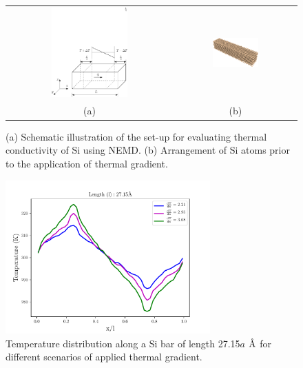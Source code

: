  
 \begin{center}
\begin{figure}[p]
\begin{tabular}{cc}
  \includegraphics[width=0.48\textwidth]{./Figures/schematic}
  &
  \hspace{3mm}
  \includegraphics[width=0.40\textwidth]{./Figures/Sibar_05}
  \\ (a) & (b)
  \end{tabular}
\caption{(a) Schematic illustration of the set-up for evaluating thermal conductivity of Si using NEMD. (b) 
Arrangement of Si atoms prior to the application of thermal gradient.}
\label{fig:setup}
\end{figure}
\end{center}

\clearpage


\begin{figure}[p]
 \begin{center}
  \includegraphics[width=0.70\textwidth]{./Figures/temp_plot}
\caption{Temperature distribution along a Si bar of length 27.15$a$ $\mbox{\normalfont\AA}$ for different scenarios of applied 
thermal gradient.}
\label{fig:kapitza}
\end{center}
\end{figure}


\clearpage


